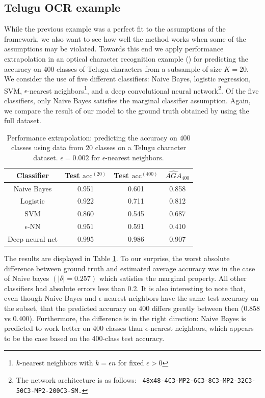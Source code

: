 \subsection{Telugu OCR example}

While the previous example was a perfect fit to the assumptions of the
framework, we also want to see how well the method works when some of
the assumptions may be violated.  Towards this end we apply performance
extrapolation in an optical character recognition example
(\cite{achanta2015telugu}) for predicting the accuracy on 400 classes
of Telugu characters from a subsample of size $K = 20$.  We consider
the use of five different classifiers: Naive Bayes, logistic
regression, SVM, $\epsilon$-nearest neighbors\footnote{$k$-nearest
  neighbors with $k = \epsilon n$ for fixed $\epsilon > 0$}, and a
deep convolutional neural network\footnote{The network architecture is
  as follows: {\tt
    48x48-4C3-MP2-6C3-8C3-MP2-32C3-50C3-MP2-200C3-SM.}}.  Of the five
classifiers, only Naive Bayes satisfies the marginal classifier
assumption.  Again, we compare the result of our model to the ground
truth obtained by using the full dataset.

\begin{table}
\centering
\begin{tabular}{|c||c|c|c|}\hline
Classifier      & Test $\text{acc}^{(20)}$ & Test $\text{acc}^{(400)}$ & $\hat{AGA}_{400}$ \\ \hline
Naive Bayes     & 0.951                   & 0.601                   & 0.858     \\ \hline
Logistic        & 0.922                   & 0.711                   & 0.812     \\ \hline
SVM             & 0.860                   & 0.545                   & 0.687     \\ \hline
$\epsilon$-NN   & 0.951                   & 0.591                   & 0.410     \\ \hline
Deep neural net & 0.995                   & 0.986                   & 0.907     \\ \hline
\end{tabular}
\caption{Performance extrapolation: predicting the accuracy on 400 classes using data from 20 classes on a Telugu character dataset.
$\epsilon = 0.002$ for $\epsilon$-nearest neighbors.}
\label{tab:telugu}
\end{table}

The results are displayed in Table \ref{tab:telugu}.  To our surprise,
the worst absolute difference between ground truth and estimated
average accuracy was in the case of Naive bayes $(|\delta| = 0.257)$
which satisfies the marginal property.  All other classifiers had
absolute errors less than 0.2.  It is also interesting to note that,
even though Naive Bayes and $\epsilon$-nearest neighbors have the same
test accuracy on the subset, that the predicted accuracy on 400
differs greatly between then (0.858 vs 0.400).  Furthermore, the
difference is in the right direction: Naive Bayes is predicted to work
better on 400 classes than $\epsilon$-nearest neighbors, which appears
to be the case based on the 400-class test accuracy.

